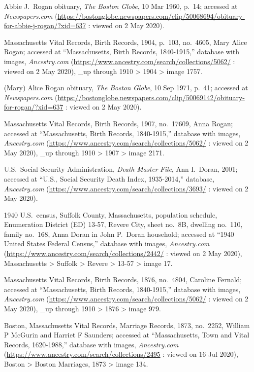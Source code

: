 \begin{thebibliography}{999}
	Abbie J.\ Rogan obituary, \textit{The Boston Globe}, 10 Mar 1960, p.\ 14; accessed at \textit{Newspapers.com} (\url{https://bostonglobe.newspapers.com/clip/50068694/obituary-for-abbie-j-rogan/?xid=637} : viewed on 2 May 2020).
	
	Massachusetts Vital Records, Birth Records, 1904, p.\ 103, no.\ 4605, Mary Alice Rogan; accessed at ``Massachusetts, Birth Records, 1840-1915,'' database with images, \textit{Ancestry.com} (\url{https://www.ancestry.com/search/collections/5062/} : viewed on 2 May 2020), \_up through 1910 > 1904 > image 1757.
	
	(Mary) Alice Rogan obituary, \textit{The Boston Globe}, 10 Sep 1971, p.\ 41; accessed at \textit{Newspapers.com} (\url{https://bostonglobe.newspapers.com/clip/50069142/obituary-for-rogan/?xid=637} : viewed on 2 May 2020).
	
	Massachusetts Vital Records, Birth Records, 1907, no.\ 17609, Anna Rogan; accessed at ``Massachusetts, Birth Records, 1840-1915,'' database with images, \textit{Ancestry.com} (\url{https://www.ancestry.com/search/collections/5062/} : viewed on 2 May 2020), \_up through 1910 > 1907 > image 2171.
	
	U.S.\ Social Security Administration, \textit{Death Master File}, Ann I.\ Doran, 2001; accessed at ``U.S., Social Security Death Index, 1935-2014,'' database, \textit{Ancestry.com} (\url{https://www.ancestry.com/search/collections/3693/} : viewed on 2 May 2020).
	
	1940 U.S.\ census, Suffolk County, Massachusetts, population schedule, Enumeration District (ED) 13-57, Revere City, sheet no.\ 8B, dwelling no.\ 110, family no.\ 168, Anna Doran in John P.\ Doran household; accessed at ``1940 United States Federal Census,'' database with images, \textit{Ancestry.com} (\url{https://www.ancestry.com/search/collections/2442/} : viewed on 2 May 2020), Massachusetts > Suffolk > Revere > 13-57 > image 17.	
	
	Massachusetts Vital Records, Birth Records, 1876, no.\ 4804, Caroline Fernald; accessed at ``Massachusetts, Birth Records, 1840-1915,'' database with images, \textit{Ancestry.com} (\url{https://www.ancestry.com/search/collections/5062/} : viewed on 2 May 2020), \_up through 1910 > 1876 > image 979.
	
	Boston, Massachusetts Vital Records, Marriage Records, 1873, no.\ 2252, William P McGurin and Harriet F Saunders; accessed at ``Massachusetts, Town and Vital Records, 1620-1988,'' database with images, \textit{Ancestry.com} (\url{https://www.ancestry.com/search/collections/2495} : viewed on 16 Jul 2020), Boston > Boston Marriages, 1873 > image 134.
	

\end{thebibliography}
